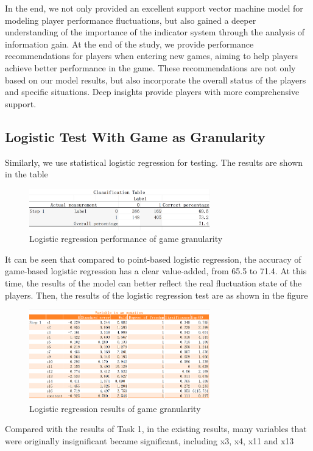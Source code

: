 \documentclass[12pt]{article}
\begin{document}
In the end, we not only provided an excellent support vector machine model for modeling player performance fluctuations, but also gained a deeper understanding of the importance of the indicator system through the analysis of information gain. At the end of the study,
we provide performance recommendations for players when entering new games, aiming to help players achieve better performance in the game. These recommendations are not only based on our model results, but also incorporate the overall status of the players and specific
situations. Deep insights provide players with more comprehensive support.

\subsection{Logistic Test With Game as Granularity}
Similarly, we use statistical logistic regression for testing. The results are shown in the table
\begin{figure}[H]
      \centering
      \includegraphics[width=0.7\textwidth]{logisitc_classification2.png}
      \caption{Logistic regression performance of game granularity}
\end{figure}
It can be seen that compared to point-based logistic regression, the accuracy of game-based logistic regression has a clear value-added,
from 65.5 to 71.4. At this time, the results of the model can better reflect the real fluctuation state of the players. Then, the results of the logistic
regression test are as shown in the figure
\begin{figure}[H]
      \centering
      \includegraphics[width=0.7\textwidth]{logistic_eq2.png}
      \caption{Logistic regression results of game granularity}
\end{figure}
Compared with the results of Task 1, in the existing results, many variables that were originally insignificant became significant, including x3, x4, x11 and x13
\end{document}
